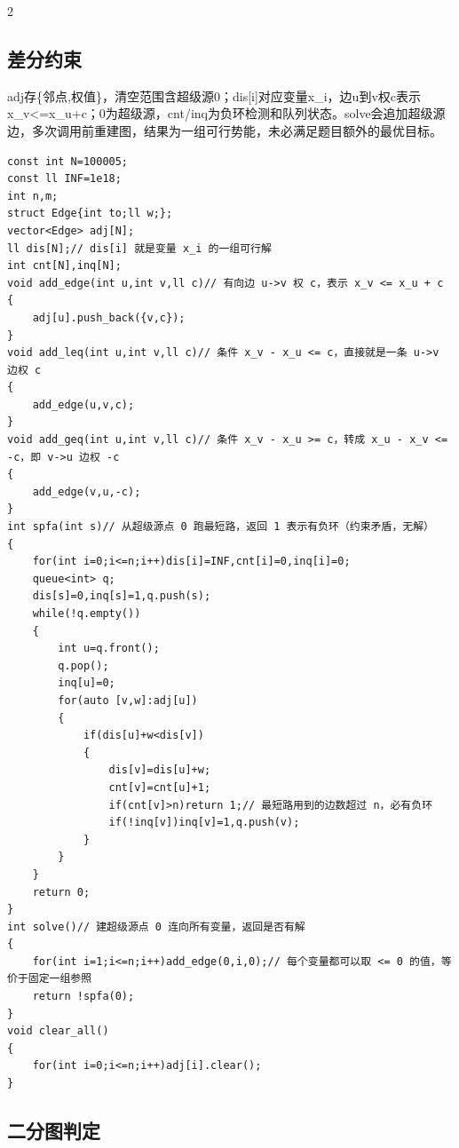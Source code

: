 \documentclass[UTF8,fontset=fandol,a4paper,twoside]{ctexart}
\newcommand{\note}[1]{{\fontsize{10}{12}\selectfont #1\par}}
\begin{document}
\begin{multicols}{2}
\subsection{差分约束}

\note{adj存\{邻点,\allowbreak{}权值\}，清空范围含超级源0；dis[\allowbreak{}i]\allowbreak{}对应变量x\_i，边u到v权c表示x\_v<\allowbreak{}=\allowbreak{}x\_u+\allowbreak{}c；0为超级源，cnt/\allowbreak{}inq为负环检测和队列状态。solve会追加超级源边，多次调用前重建图，结果为一组可行势能，未必满足题目额外的最优目标。}
\begin{lstlisting}
const int N=100005;
const ll INF=1e18;
int n,m;
struct Edge{int to;ll w;};
vector<Edge> adj[N];
ll dis[N];// dis[i] 就是变量 x_i 的一组可行解
int cnt[N],inq[N];
void add_edge(int u,int v,ll c)// 有向边 u->v 权 c，表示 x_v <= x_u + c
{
    adj[u].push_back({v,c});
}
void add_leq(int u,int v,ll c)// 条件 x_v - x_u <= c，直接就是一条 u->v 边权 c
{
    add_edge(u,v,c);
}
void add_geq(int u,int v,ll c)// 条件 x_v - x_u >= c，转成 x_u - x_v <= -c，即 v->u 边权 -c
{
    add_edge(v,u,-c);
}
int spfa(int s)// 从超级源点 0 跑最短路，返回 1 表示有负环（约束矛盾，无解）
{
    for(int i=0;i<=n;i++)dis[i]=INF,cnt[i]=0,inq[i]=0;
    queue<int> q;
    dis[s]=0,inq[s]=1,q.push(s);
    while(!q.empty())
    {
        int u=q.front();
        q.pop();
        inq[u]=0;
        for(auto [v,w]:adj[u])
        {
            if(dis[u]+w<dis[v])
            {
                dis[v]=dis[u]+w;
                cnt[v]=cnt[u]+1;
                if(cnt[v]>n)return 1;// 最短路用到的边数超过 n，必有负环
                if(!inq[v])inq[v]=1,q.push(v);
            }
        }
    }
    return 0;
}
int solve()// 建超级源点 0 连向所有变量，返回是否有解
{
    for(int i=1;i<=n;i++)add_edge(0,i,0);// 每个变量都可以取 <= 0 的值，等价于固定一组参照
    return !spfa(0);
}
void clear_all()
{
    for(int i=0;i<=n;i++)adj[i].clear();
}
\end{lstlisting}
\subsection{二分图判定}


\end{multicols}
\end{document}
